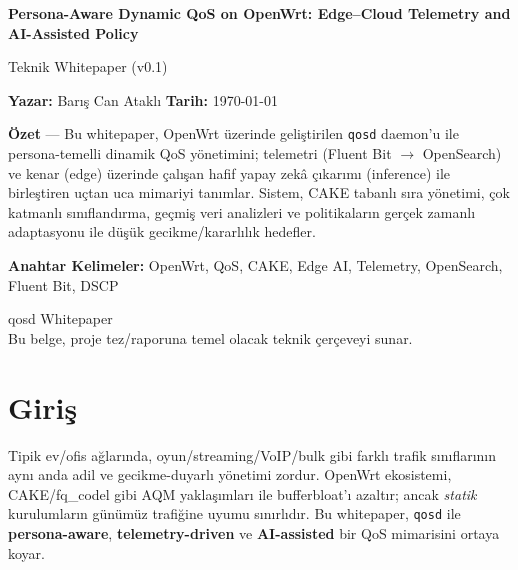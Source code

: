 \documentclass[11pt,a4paper]{article}
\newcommand{\projecttitle}{Persona-Aware Dynamic QoS on OpenWrt: Edge–Cloud Telemetry and AI-Assisted Policy}
\newcommand{\shorttitle}{qosd Whitepaper}
\begin{document}
\begin{titlepage}
  \centering
  {\Large \textbf{\projecttitle}\par}
  \vspace{8pt}
  {\large Teknik Whitepaper (v0.1)\par}
  \vspace{18pt}
  \textbf{Yazar:} Barış Can Ataklı \hfill \textbf{Tarih:} \today

  \vfill
  \begin{minipage}{0.9\textwidth}
  \textbf{Özet} — Bu whitepaper, OpenWrt üzerinde geliştirilen \texttt{qosd} daemon'u ile
  persona-temelli dinamik QoS yönetimini; telemetri (Fluent Bit $\rightarrow$ OpenSearch) ve
  kenar (edge) üzerinde çalışan hafif yapay zekâ çıkarımı (inference) ile birleştiren uçtan uca
  mimariyi tanımlar. Sistem, CAKE tabanlı sıra yönetimi, çok katmanlı sınıflandırma, geçmiş veri
  analizleri ve politikaların gerçek zamanlı adaptasyonu ile düşük gecikme/kararlılık hedefler.
  \end{minipage}

  \vspace{12pt}
  \textbf{Anahtar Kelimeler:} OpenWrt, QoS, CAKE, Edge AI, Telemetry, OpenSearch, Fluent Bit, DSCP

  \vfill
  \textcolor{softgray}{\shorttitle} \\
  \textcolor{softgray}{Bu belge, proje tez/raporuna temel olacak teknik çerçeveyi sunar.}
\end{titlepage}

\tableofcontents
\newpage

\section{Giriş}
Tipik ev/ofis ağlarında, oyun/streaming/VoIP/bulk gibi farklı trafik sınıflarının aynı anda
adil ve gecikme-duyarlı yönetimi zordur. OpenWrt ekosistemi, CAKE/fq\_codel gibi AQM
yaklaşımları ile bufferbloat'ı azaltır; ancak \emph{statik} kurulumların günümüz trafiğine
uyumu sınırlıdır. Bu whitepaper, \texttt{qosd} ile \textbf{persona-aware}, \textbf{telemetry-driven} ve
\textbf{AI-assisted} bir QoS mimarisini ortaya koyar.
\end{document}
